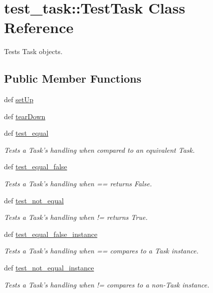 \hypertarget{classtest__task_1_1TestTask}{
\section{test\-\_\-task\-:\-:\-Test\-Task \-Class \-Reference}
\label{classtest__task_1_1TestTask}
}


\-Tests \-Task objects.  


\subsection*{\-Public \-Member \-Functions}
\begin{DoxyCompactItemize}
\item 
def \hyperlink{classtest__task_1_1TestTask_aa16cc539a6857b7be141a5b45d55b443}{set\-Up}
\item 
def \hyperlink{classtest__task_1_1TestTask_a31e0d5deaf86abc966ec43c06003b994}{tear\-Down}
\item 
def \hyperlink{classtest__task_1_1TestTask_a8168a86d54e2cc00240e812271a2d5b3}{test\-\_\-equal}
\begin{DoxyCompactList}\small\item\em \-Tests a \-Task's handling when compared to an equivalent \-Task. \end{DoxyCompactList}\item 
def \hyperlink{classtest__task_1_1TestTask_a2e3b19feba163771555b4625358ef890}{test\-\_\-equal\-\_\-false}
\begin{DoxyCompactList}\small\item\em \-Tests a \-Task's handling when == returns \-False. \end{DoxyCompactList}\item 
def \hyperlink{classtest__task_1_1TestTask_a29b698f43d3f816aec619e3d3de71673}{test\-\_\-not\-\_\-equal}
\begin{DoxyCompactList}\small\item\em \-Tests a \-Task's handling when != returns \-True. \end{DoxyCompactList}\item 
def \hyperlink{classtest__task_1_1TestTask_a8419f9c14d8e9475b6dfa7bc75fbe285}{test\-\_\-equal\-\_\-false\-\_\-instance}
\begin{DoxyCompactList}\small\item\em \-Tests a \-Task's handling when == compares to a \-Task instance. \end{DoxyCompactList}\item 
def \hyperlink{classtest__task_1_1TestTask_a34481ea4940b6104d28d8bb2faaed462}{test\-\_\-not\-\_\-equal\-\_\-instance}
\begin{DoxyCompactList}\small\item\em \-Tests a \-Task's handling when != compares to a non-\/\-Task instance. \end{DoxyCompactList}\end{DoxyCompactItemize}
